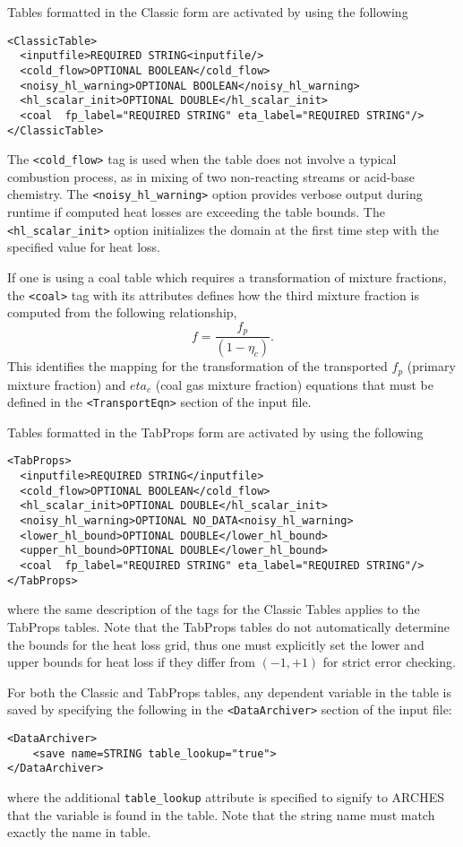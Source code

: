 Tables formatted in the Classic form are activated by using the following 
%
\begin{Verbatim}[fontsize=\footnotesize]
<ClassicTable>
  <inputfile>REQUIRED STRING<inputfile/> 
  <cold_flow>OPTIONAL BOOLEAN</cold_flow> 
  <noisy_hl_warning>OPTIONAL BOOLEAN</noisy_hl_warning>  
  <hl_scalar_init>OPTIONAL DOUBLE</hl_scalar_init> 
  <coal  fp_label="REQUIRED STRING" eta_label="REQUIRED STRING"/> 
</ClassicTable>
\end{Verbatim} 
%
The \verb=<cold_flow>= tag is used when the table does not involve a typical combustion process, as in mixing of two non-reacting streams or acid-base chemistry.  The \verb=<noisy_hl_warning>= option provides verbose output during runtime if computed heat losses are exceeding the table bounds.  The \verb=<hl_scalar_init>= option initializes the domain at the first time step with the specified value for heat loss.  

If one is using a coal table which requires a transformation of mixture fractions, the \verb=<coal>= tag with its attributes defines how the third mixture fraction is computed from the following relationship, 
\begin{equation}
f = \frac{ f_p }{(1 - \eta_c) }.
\end{equation}   
This identifies the mapping for the transformation of the transported $f_p$ (primary mixture fraction) and  $eta_c$ (coal gas mixture fraction) equations that must be defined in the \verb=<TransportEqn>= section of the input file.  

Tables formatted in the TabProps form are activated by using the following
%
\begin{Verbatim}[fontsize=\footnotesize]
<TabProps>
  <inputfile>REQUIRED STRING</inputfile> 
  <cold_flow>OPTIONAL BOOLEAN</cold_flow>
  <hl_scalar_init>OPTIONAL DOUBLE</hl_scalar_init> 
  <noisy_hl_warning>OPTIONAL NO_DATA<noisy_hl_warning> 
  <lower_hl_bound>OPTIONAL DOUBLE</lower_hl_bound>
  <upper_hl_bound>OPTIONAL DOUBLE</lower_hl_bound>
  <coal  fp_label="REQUIRED STRING" eta_label="REQUIRED STRING"/> 
</TabProps>
\end{Verbatim}
%
where the same description of the tags for the Classic Tables applies to the TabProps tables.  Note that the TabProps tables do not automatically determine the bounds for the heat loss grid, thus one must explicitly set the lower and upper bounds for heat loss if they differ from $(-1, +1)$ for strict error checking.  

For both the Classic and TabProps tables, any dependent variable in the table is saved by specifying the following in the \verb=<DataArchiver>= section of the input file: 
%
\begin{Verbatim}[fontsize=\footnotesize]
<DataArchiver>
    <save name=STRING table_lookup="true"> 
</DataArchiver>
\end{Verbatim} 
%
where the additional \verb=table_lookup= attribute is specified to signify to ARCHES that the variable is found in the table.  Note that the string name must match exactly the name in table.  

